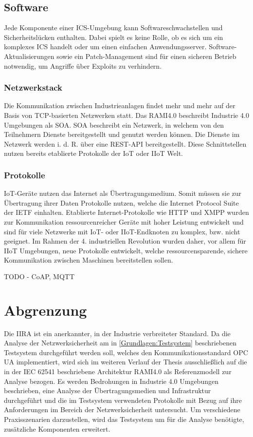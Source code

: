 \subsection{Software}
Jede Komponente einer \ac{ICS}-Umgebung kann Softwareschwachstellen und Sicherheitslücken enthalten. Dabei spielt es keine Rolle, ob es sich um ein komplexes \ac{ICS} handelt oder um einen einfachen Anwendungsserver. Software-Aktualisierungen sowie ein Patch-Management sind für einen sicheren Betrieb notwendig, um Angriffe über Exploits zu verhindern. 

\subsubsection{Netzwerkstack}
Die Kommunikation zwischen Industrieanlagen findet mehr und mehr auf der Basis von TCP-basierten Netzwerken statt. Das \ac{RAMI4.0} beschreibt Industrie 4.0 Umgebungen als \ac{SOA}. \ac{SOA} beschreibt ein Netzwerk, in welchem von den Teilnehmern Dienste bereitgestellt und genutzt werden können. Die Dienste im Netzwerk werden i. d. R. über eine \ac{REST}-\ac{API} bereitgestellt. Diese Schnittstellen nutzen bereits etablierte Protokolle der \ac{IoT} oder \ac{IIoT} Welt.

\subsubsection{Protokolle}
\ac{IoT}-Geräte nutzen das Internet als Übertragungsmedium. Somit müssen sie zur Übertragung ihrer Daten Protokolle nutzen, welche die Internet Protocol Suite der \ac{IETF} einhalten. Etablierte Internet-Protokolle wie HTTP und XMPP wurden zur Kommunikation ressourcenreicher Geräte mit hoher Leistung entwickelt und sind für viele Netzwerke mit \ac{IoT}- oder \ac{IIoT}-Endknoten zu komplex, bzw. nicht geeignet. Im Rahmen der 4. industriellen Revolution wurden daher, vor allem für \ac{IIoT} Umgebungen, neue Protokolle entwickelt, welche ressourcensparende, sichere Kommunikation zwischen Maschinen bereitstellen sollen. 

TODO - CoAP, MQTT

\section{Abgrenzung}
Die \ac{IIRA} ist ein anerkannter, in der Industrie verbreiteter Standard. Da die Analyse der Netzwerksicherheit am in \autoref{Grundlagen:Testsystem} beschriebenen Testsystem durchgeführt werden soll, welches den Kommunikationsstandard \ac{OPC UA} implementiert, wird sich im weiteren Verlauf der Thesis ausschließlich auf die in der IEC 62541 beschriebene Architektur \ac{RAMI4.0} als Referenzmodell zur Analyse bezogen. Es werden Bedrohungen in Industrie 4.0 Umgebungen beschrieben, eine Analyse der Übertragungsmedien und Infrastruktur durchgeführt und die im Testsystem verwendeten Protokolle mit Bezug auf ihre Anforderungen im Bereich der Netzwerksicherheit untersucht. Um verschiedene Praxisszenarien darzustellen, wird das Testsystem um für die Analyse benötigte, zusätzliche Komponenten erweitert. 

